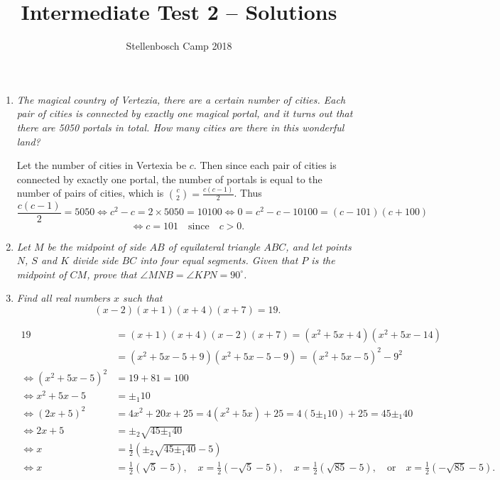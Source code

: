 \documentclass{article}
\title{Intermediate Test 2 -- Solutions}
\author{Stellenbosch Camp 2018}
\date{\vspace{-12pt}}
\begin{document}
\maketitle

\begin{enumerate}

\item %
\textit{The magical country of Vertexia, there are a certain number of cities. Each pair of cities is connected by exactly one magical portal, and it turns out that there are 5050 portals in total. How many cities are there in this wonderful land?}

Let the number of cities in Vertexia be $c$. Then since each pair of cities is connected by exactly one portal, the number of portals is equal to the number of pairs of cities, which is $\binom{c}{2} = \frac{c(c-1)}{2}$. Thus \[ \frac{c(c-1)}{2} = 5050 \iff c^2 -c = 2\times5050 = 10100 \iff 0 = c^2 -c -10100 = (c-101)(c+100) \]
\[ \iff c = 101 \quad \mathrm{since} \quad c > 0. \]


\vspace{12pt}
\item 
\textit{Let $M$ be the midpoint of side $AB$ of equilateral triangle $ABC$, and let points $N$, $S$ and $K$ divide side $BC$ into four equal segments. Given that $P$ is the midpoint of $CM$, prove that $\angle MNB = \angle KPN = 90^\circ$.}




\vspace{12pt}
\item %
\textit{Find all real numbers $x$ such that \[ (x-2)(x+1)(x+4)(x+7) = 19. \]}

\vspace{-36pt}
\begin{align*}
  19 &= (x+1)(x+4)(x-2)(x+7) = (x^2+5x+4)(x^2+5x-14) \\
  &= (x^2+5x-5+9)(x^2+5x-5-9) = (x^2+5x-5)^2-9^2 \\
  \iff (x^2+5x-5)^2 &= 19+81 = 100 \\
  \iff x^2+5x-5 &= \pm_1 10 \\
  \iff (2x+5)^2 &= 4x^2+20x+25 = 4(x^2+5x)+25 = 4(5\pm_1 10)+25 = 45 \pm_1 40 \\
  \iff 2x+5 &= \pm_2\sqrt{45\pm_1 40} \\
  \iff x &= \frac{1}{2} \left(\pm_2\sqrt{45\pm_1 40} -5\right) \\
  \iff x &= \frac{1}{2}(\sqrt{5}-5),\quad x = \frac{1}{2}(-\sqrt{5}-5),\quad x = \frac{1}{2}(\sqrt{85}-5),\quad \mathrm{or}\quad x = \frac{1}{2}(-\sqrt{85}-5).
\end{align*}



\end{enumerate}
\end{document}
